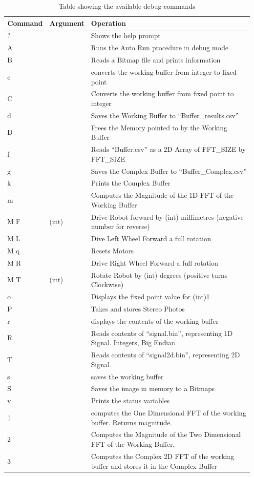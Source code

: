 \begin{table}
\centering
\caption{Table showing the available debug commands}
\label{table:Debug}
\begin{tabular}{llp{10cm}}\toprule
Command & Argument & Operation \\\toprule
? && Shows the help prompt\\ \midrule
A && Runs the Auto Run procedure in debug mode\\ \midrule
B && Reads a Bitmap file and prints information \\ \midrule
c && converts the working buffer from integer to fixed point\\\midrule
C && Converts the working buffer from fixed point to integer\\\midrule
d && Saves the Working Buffer to ``Buffer\_results.csv'' \\ \midrule
D && Frees the Memory pointed to by the Working Buffer \\ \midrule
f && Reads ``Buffer.csv'' as a 2D Array of FFT\_SIZE by FFT\_SIZE\\ \midrule
g && Saves the Complex Buffer to ``Buffer\_Complex.csv'' \\\midrule
k && Prints the Complex Buffer \\ \midrule
m && Computes the Magnitude of the 1D FFT of the Working Buffer \\\midrule
M F &(int) & Drive Robot forward by (int) millimetres (negative number for reverse)\\\midrule
M L && Dive Left Wheel Forward a full rotation \\\midrule
M q && Resets Motors \\\midrule
M R && Drive Right Wheel Forward a full rotation \\\midrule
M T &(int) & Rotate Robot by (int) degrees (positive turns Clockwise)\\\midrule
o && Displays the fixed point value for (int)1 \\\midrule
P && Takes and stores Stereo Photos \\ \midrule
r && displays the contents of the working buffer\\\midrule
R && Reads contents of ``signal.bin'', representing 1D Signal. Integers, Big Endian\\\midrule
T && Reads contents of ``signal2d.bin'', representing 2D Signal. \\ \midrule
s && saves the working buffer\\\midrule
S && Saves the image in memory to a Bitmaps \\\midrule
v && Prints the status variables \\ \midrule
1 && computes the One Dimensional FFT of the working buffer. Returns magnitude.\\\midrule
2 && Computes the Magnitude of the Two Dimensional FFT of the Working Buffer. \\ \midrule
3 && Computes the Complex 2D FFT of the working buffer and stores it in the Complex Buffer \\ \bottomrule
\end{tabular}
\end{table}


